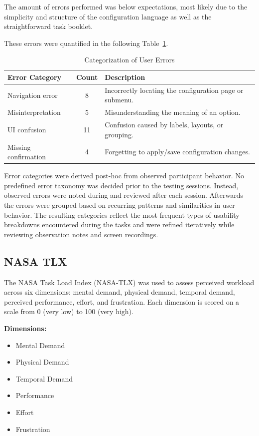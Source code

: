 The amount of errors performed was below expectations, most likely due to the simplicity and structure of the configuration language as well as the straightforward task booklet.

These errors were quantified in the following Table~\ref{tab:usability_errors}.

\begin{table}[htbp]
	\centering
	\caption{Categorization of User Errors}
	\label{tab:usability_errors}
	\begin{tabular}{lcl}
		\toprule
		\textbf{Error Category} & \textbf{Count} & \textbf{Description} \\
		\midrule
		Navigation error & 8 & Incorrectly locating the configuration page or submenu. \\
		Misinterpretation & 5 & Misunderstanding the meaning of an option. \\
		UI confusion & 11 & Confusion caused by labels, layouts, or grouping. \\
		Missing confirmation & 4 & Forgetting to apply/save configuration changes. \\
		\bottomrule
	\end{tabular}
\end{table}

Error categories were derived post-hoc from observed participant behavior. No predefined error taxonomy was decided prior to the testing sessions. Instead, observed errors were noted during and reviewed after each session. Afterwards the errors were grouped based on recurring patterns and similarities in user behavior. The resulting categories reflect the most frequent types of usability breakdowns encountered during the tasks and were refined iteratively while reviewing observation notes and screen recordings.


\subsection{NASA \gls{TLX}}
\label{sec:test_usabl_nasa}

The NASA Task Load Index (NASA-\gls{TLX}) was used to assess perceived workload across six dimensions: mental demand, physical demand, temporal demand, perceived performance, effort, and frustration. Each dimension is scored on a scale from 0 (very low) to 100 (very high).

\textbf{Dimensions:}
\begin{itemize}
	\item Mental Demand
	\item Physical Demand
	\item Temporal Demand
	\item Performance
	\item Effort
	\item Frustration
\end{itemize}

